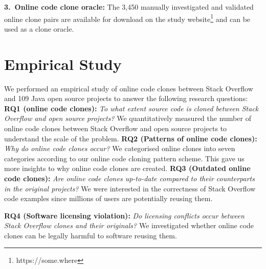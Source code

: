 \documentclass{sig-alternate-05-2015}
\begin{document}
\vspace{0.5ex}%
\noindent\textbf{3.~Online code clone oracle:} The 3,450 manually investigated and validated online clone pairs are available for download on the study website\footnote{https://some.where} and can be used as a clone oracle.

\section{Empirical Study}
We performed an empirical study of online code clones between Stack Overflow and 109 Java open source projects to answer the following research questions: \\ 
\textbf{RQ1 (online code clones):} \textit{To what extent  source code is cloned between Stack Overflow and open source projects?} We quantitatively measured the number of online code clones between Stack Overflow and open source projects to understand the scale of the problem. \newline
\textbf{RQ2 (Patterns of online code clones):} \textit{Why do online code clones occur?} We categorised online clones into seven categories according to our online code cloning pattern scheme. This gave us more insights to why online code clones are created. %
\newline
\textbf{RQ3 (Outdated online code clones):} \textit{Are online code clones up-to-date compared to their counterparts in the original projects?} We were interested in the correctness of Stack Overflow code examples since millions of users are potentially reusing them.  %

\textbf{RQ4 (Software licensing violation):} \textit{Do licensing conflicts occur between Stack Overflow clones and their originals?} We investigated whether online code clones can be legally harmful to software reusing them.
\end{document}
